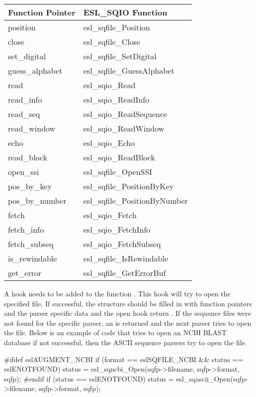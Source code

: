 \begin{tabular}{ll} \\
Function Pointer & ESL\_SQIO Function \\ \hline
position & esl\_sqfile\_Position \\
close & esl\_sqfile\_Close \\
set\_digital & esl\_sqfile\_SetDigital \\
guess\_alphabet & esl\_sqfile\_GuessAlphabet \\
read & esl\_sqio\_Read  \\
read\_info & esl\_sqio\_ReadInfo   \\
read\_seq & esl\_sqio\_ReadSequence \\
read\_window & esl\_sqio\_ReadWindow \\
echo & esl\_sqio\_Echo  \\
read\_block & esl\_sqio\_ReadBlock  \\
open\_ssi & esl\_sqfile\_OpenSSI     \\
pos\_by\_key & esl\_sqfile\_PositionByKey    \\
pos\_by\_number & esl\_sqfile\_PositionByNumber \\
fetch & esl\_sqio\_Fetch       \\
fetch\_info & esl\_sqio\_FetchInfo   \\
fetch\_subseq & esl\_sqio\_FetchSubseq \\
is\_rewindable & esl\_sqfile\_IsRewindable  \\
get\_error & esl\_sqfile\_GetErrorBuf \\
\end{tabular}

\bigskip
A hook needs to be added to the function .
This hook will try to open the specified file.  If successful,
the  structure should be filled in with function
pointers and the parser specific data and the open hook
return .  If the sequence files were not found for
the specific parser, an  is returned and
the next parser tries to open the file.  Below is an example
of code that tries to open an NCBI BLAST database if not
successful, then the ASCII sequence parsers try to open the
file.

\begin{cchunk}
#ifdef eslAUGMENT\_NCBI
    if (format == eslSQFILE\_NCBI && status == eslENOTFOUND)
      status = esl\_sqncbi\_Open(sqfp->filename, sqfp->format, sqfp);
#endif
    if (status == eslENOTFOUND)
      status = esl\_sqascii\_Open(sqfp->filename, sqfp->format, sqfp);
\end{cchunk}
